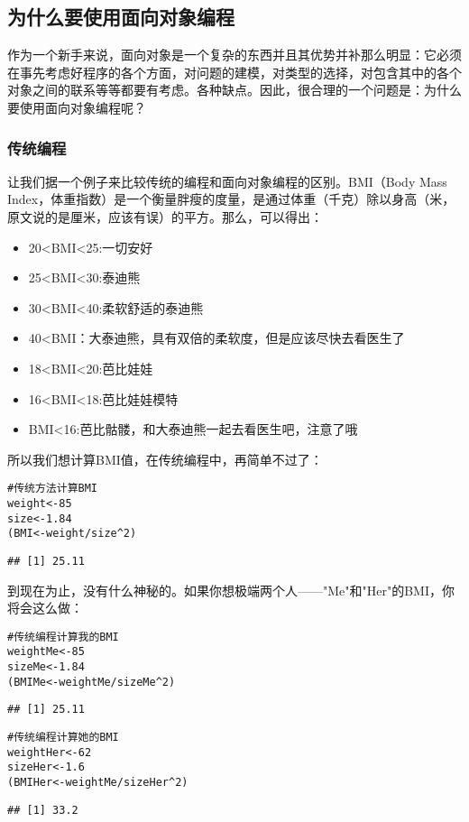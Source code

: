 \documentclass[12pt,a4paper]{article}\usepackage{graphicx, color}
\makeatletter
\newcommand{\hlcomment}[1]{\textcolor[rgb]{0.180392156862745,0.6,0.341176470588235}{#1}}%
\newenvironment{kframe}{%
 \def\at@end@of@kframe{}%
 \ifinner\ifhmode%
  \def\at@end@of@kframe{\end{minipage}}%
  \begin{minipage}{\columnwidth}%
 \fi\fi%
 \def\FrameCommand##1{\hskip\@totalleftmargin \hskip-\fboxsep
 \colorbox{shadecolor}{##1}\hskip-\fboxsep
     \hskip-\linewidth \hskip-\@totalleftmargin \hskip\columnwidth}%
 \MakeFramed {\advance\hsize-\width
   \@totalleftmargin\z@ \linewidth\hsize
   \@setminipage}}%
 {\par\unskip\endMakeFramed%
 \at@end@of@kframe}
\newenvironment{knitrout}{}{} %
\makeatother
\begin{document}
\subsection{为什么要使用面向对象编程}
作为一个新手来说，面向对象是一个复杂的东西并且其优势并补那么明显：它必须在事先考虑好程序的各个方面，对问题的建模，对类型的选择，对包含其中的各个对象之间的联系等等都要有考虑。各种缺点。因此，很合理的一个问题是：为什么要使用面向对象编程呢？
\subsubsection{传统编程}
让我们据一个例子来比较传统的编程和面向对象编程的区别。BMI（Body Mass Index，体重指数）是一个衡量胖瘦的度量，是通过体重（千克）除以身高（米，原文说的是厘米，应该有误）的平方。那么，可以得出：
\begin{itemize}
  \item 20<BMI<25:一切安好
  \item 25<BMI<30:泰迪熊
  \item 30<BMI<40:柔软舒适的泰迪熊
  \item 40<BMI：大泰迪熊，具有双倍的柔软度，但是应该尽快去看医生了
  \item 18<BMI<20:芭比娃娃
  \item 16<BMI<18:芭比娃娃模特
  \item BMI<16:芭比骷髅，和大泰迪熊一起去看医生吧，注意了哦
\end{itemize}
所以我们想计算BMI值，在传统编程中，再简单不过了：
\begin{knitrout}
\color{fgcolor}\begin{kframe}
\begin{alltt}
\hlcomment{# 传统方法计算BMI}
weight <- 85
size <- 1.84
(BMI <- weight/size^2)
\end{alltt}
\begin{verbatim}
## [1] 25.11
\end{verbatim}
\end{kframe}
\end{knitrout}

到现在为止，没有什么神秘的。如果你想极端两个人——"Me"和"Her"的BMI，你将会这么做：
\begin{knitrout}
\color{fgcolor}\begin{kframe}
\begin{alltt}
\hlcomment{# 传统编程计算我的BMI}
weightMe <- 85
sizeMe <- 1.84
(BMIMe <- weightMe/sizeMe^2)
\end{alltt}
\begin{verbatim}
## [1] 25.11
\end{verbatim}
\begin{alltt}

\hlcomment{# 传统编程计算她的BMI}
weightHer <- 62
sizeHer <- 1.6
(BMIHer <- weightMe/sizeHer^2)
\end{alltt}
\begin{verbatim}
## [1] 33.2
\end{verbatim}
\end{kframe}
\end{knitrout}
\end{document}
